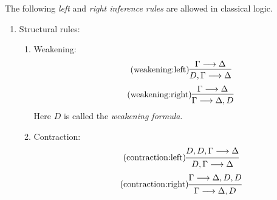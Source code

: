 \documentclass[11pt,a4paper]{article}
\begin{document}
\begin{definition}%
\label{def:inference rules in LK}
The following \emph{left} and \emph{right inference rules} are allowed in classical logic.
\begin{enumerate}
    \item\label{it:structural rules} Structural rules:
        \begin{enumerate}
            \item\label{it:weakening} Weakening:
                \begin{equation}
                    \tag{weakening:left}
                    \label{eq:weakening:left}
                    \begin{prooftree}
                        \hypo{\Gamma\seq\Delta}
                        \infer1{D, \Gamma\seq\Delta}
                    \end{prooftree}
                \end{equation}
                \begin{equation}
                    \tag{weakening:right}
                    \label{eq:weakening:right}
                    \begin{prooftree}
                        \hypo{\Gamma\seq\Delta}
                        \infer1{\Gamma\seq\Delta, D}
                    \end{prooftree}
                \end{equation}
                Here \(D\) is called the \emph{weakening formula}.
            \item\label{it:contraction} Contraction:
                \begin{equation}
                    \tag{contraction:left}
                    \label{eq:contraction:left}
                    \begin{prooftree}
                        \hypo{D, D, \Gamma\seq\Delta}
                        \infer1{D, \Gamma\seq\Delta}
                    \end{prooftree}
                \end{equation}
                \begin{equation}
                    \tag{contraction:right}
                    \label{eq:contraction:right}
                    \begin{prooftree}
                        \hypo{\Gamma\seq\Delta, D, D}
                        \infer1{\Gamma\seq\Delta, D}
                    \end{prooftree}
                \end{equation}

\end{enumerate}
\end{enumerate}
\end{definition}
\end{document}
